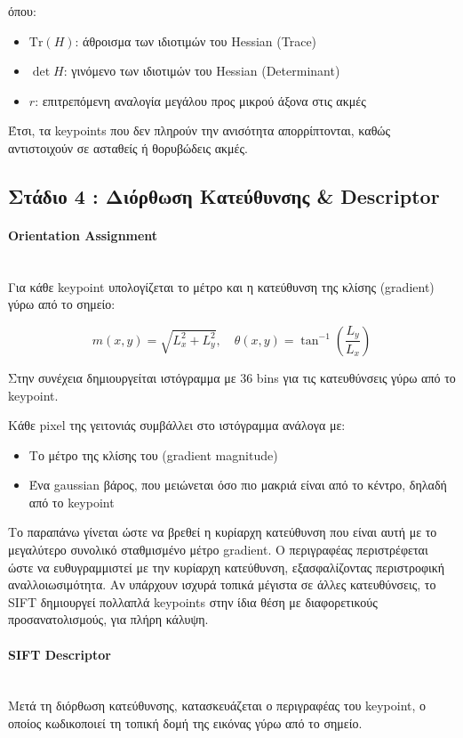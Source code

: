 \documentclass[12pt]{article}
\begin{document}
όπου:

\begin{itemize}
  \item $\mathrm{Tr}(H)$: άθροισμα των ιδιοτιμών του Hessian (Trace)
  \item $\det H$: γινόμενο των ιδιοτιμών του Hessian (Determinant)
  \item $r$: επιτρεπόμενη αναλογία μεγάλου προς μικρού άξονα στις ακμές
\end{itemize}

Έτσι, τα keypoints που δεν πληρούν την ανισότητα απορρίπτονται, καθώς αντιστοιχούν σε ασταθείς ή θορυβώδεις ακμές.

\subsection{Στάδιο 4 : Διόρθωση Κατεύθυνσης \& Descriptor}
\paragraph{Orientation Assignment}
\mbox{}\\
Για κάθε keypoint υπολογίζεται το μέτρο και η κατεύθυνση της κλίσης (gradient) γύρω από το σημείο:

\[
m(x,y) = \sqrt{L_x^2 + L_y^2}, \quad
\theta(x,y) = \tan^{-1}\left(\frac{L_y}{L_x}\right)
\]

Στην συνέχεια δημιουργείται ιστόγραμμα με 36 bins για τις κατευθύνσεις γύρω από το keypoint.

Κάθε pixel της γειτονιάς συμβάλλει στο ιστόγραμμα ανάλογα με:
\begin{itemize}
  \item Το μέτρο της κλίσης του (gradient magnitude)
  \item Ένα gaussian βάρος, που μειώνεται όσο πιο μακριά είναι από το κέντρο, δηλαδή από το keypoint
\end{itemize}

Το παραπάνω γίνεται ώστε να βρεθεί η κυρίαρχη κατεύθυνση που είναι αυτή με το μεγαλύτερο συνολικό σταθμισμένο μέτρο gradient. Ο περιγραφέας περιστρέφεται ώστε να ευθυγραμμιστεί με την κυρίαρχη κατεύθυνση, 
εξασφαλίζοντας περιστροφική αναλλοιωσιμότητα.
Αν υπάρχουν ισχυρά τοπικά μέγιστα σε άλλες κατευθύνσεις, το SIFT δημιουργεί πολλαπλά keypoints στην ίδια θέση με διαφορετικούς προσανατολισμούς, για πλήρη κάλυψη.

\paragraph{SIFT Descriptor}
\mbox{}\\
Μετά τη διόρθωση κατεύθυνσης, κατασκευάζεται ο περιγραφέας του keypoint, ο οποίος κωδικοποιεί τη τοπική δομή της εικόνας γύρω από το σημείο.
\end{document}
